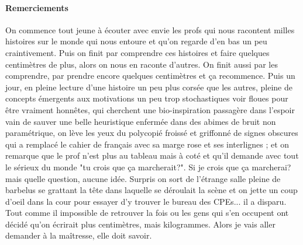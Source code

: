 \documentclass[a4paper,10pt]{report}
\begin{document}
% 	
	\newpage
% 	
% 	
	\begin{itshape}
		\small
		\paragraph{Remerciements}
	
		On commence tout jeune à écouter avec envie les profs qui nous racontent milles histoires sur le monde qui nous entoure et qu'on regarde d'en bas un peu craintivement. Puis on finit par comprendre ces histoires et faire quelques centimètres de plus, alors on nous en raconte d'autres. On finit aussi par les comprendre, par prendre encore quelques centimètres et \c ca recommence.
		Puis un jour, en pleine lecture d'une histoire un peu plus corsée que les autres, pleine de concepts émergents aux motivations un peu trop stochastiques voir floues pour être vraiment honnêtes, qui cherchent une bio-inspiration passagère dans l'espoir vain de sauver une belle heuristique enfermée dans des abimes de bruit non paramétrique, on lève les yeux du polycopié froissé et griffonné de signes obscures qui a remplacé le cahier de fran\c cais avec sa marge rose et ses interlignes ; et on remarque que le prof n'est plus au tableau mais à coté et qu'il demande avec tout le sérieux du monde "tu crois que \c ca marcherait?". Si je crois que \c ca marcherai? mais quelle question, aucune idée. Surpris on sort de l'étrange salle pleine de barbelus se grattant la tête dans laquelle se déroulait la scène et on jette un coup d'oeil dans la cour pour essayer d'y trouver le bureau des CPEs... il a disparu. Tout comme il impossible de retrouver la fois ou les gens qui s'en occupent ont décidé qu'on écrirait plus centimètres, mais kilogrammes. Alors je vais aller demander à la maîtresse, elle doit savoir.

\end{itshape}
\end{document}
